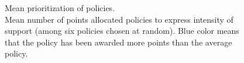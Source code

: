 \documentclass[12pt,english]{article}
\begin{document}
\begin{figure}[h!] %
  \caption[Mean prioritization of policies]{Mean prioritization of policies. \\Mean number of points allocated policies to express intensity of support (among six policies chosen at random). Blue color means that the policy has been awarded more points than the average policy.}\label{fig:points}
\end{figure}


\clearpage
        

\clearpage
\renewcommand{\url}[1]{\href{#1}{Link}} %

\end{document}
